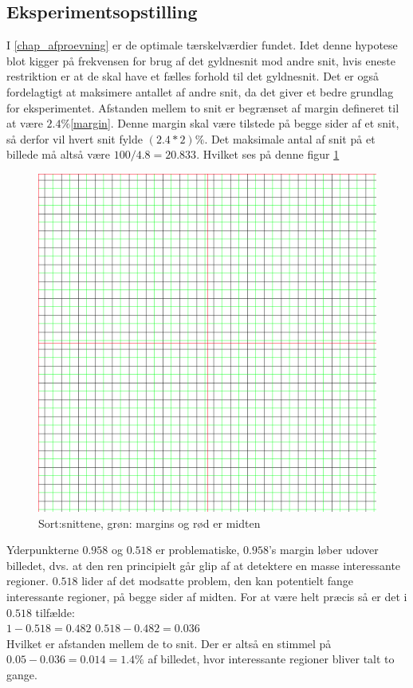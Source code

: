 {
\subsection{Eksperimentsopstilling}
I \ref{chap_afproevning} er de optimale tærskelværdier fundet.
Idet denne hypotese blot kigger på frekvensen for brug af det gyldnesnit
mod andre snit, hvis eneste restriktion er at de skal have et fælles
forhold til det gyldnesnit.
Det er også fordelagtigt at maksimere antallet af andre snit, da det
giver et bedre grundlag for eksperimentet.
Afstanden mellem to snit er begrænset af margin defineret til at være
$2.4\%$\ref{margin}. 
Denne margin skal være tilstede på begge sider af et snit, så derfor vil
hvert snit fylde $(2.4*2)\%$.
Det maksimale antal af snit på et billede må altså være
$100/4.8=20.833$. Hvilket ses på denne figur \ref{snitogmargin}
\begin{figure}[ht]
	\begin{center}
		\includegraphics[scale=0.3]{afsnit/resultater/billeder/20_cuts_med_margin}
	\end{center}
	\caption{Sort:snittene, grøn: margins og rød er midten}
	\label{snitogmargin}
\end{figure}
Yderpunkterne $0.958$ og $0.518$ er problematiske, $0.958$'s margin
løber udover billedet, dvs. at den ren principielt går glip af at
detektere en masse interessante regioner.
$0.518$ lider af det modsatte problem, den kan potentielt fange
interessante regioner, på begge sider af midten.
For at være helt præcis så er det i $0.518$ tilfælde:\\
$1-0.518 = 0.482$
$0.518-0.482=0.036$\\
Hvilket er afstanden mellem de to snit.
Der er altså en stimmel på $0.05-0.036 = 0.014 = 1.4\%$ af billedet,
hvor interessante regioner bliver talt to gange.

}
